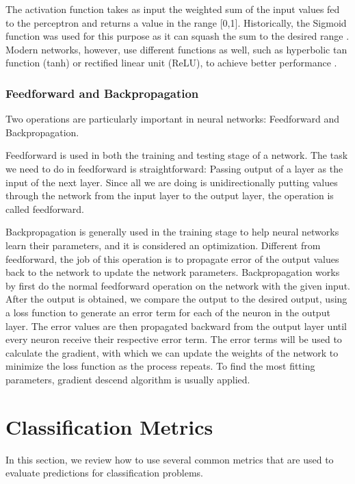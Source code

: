 The activation function takes as input the weighted sum of the input values fed to the perceptron and returns a value in the range [0,1]. Historically, the Sigmoid function was used for this purpose as it can squash the sum to the desired range \cite{li2015cs231n}. Modern networks, however, use different functions as well, such as hyperbolic tan function (tanh) or rectified linear unit (ReLU), to achieve better performance \cite{li2015cs231n}.

\subsubsection{Feedforward and Backpropagation}

Two operations are particularly important in neural networks: Feedforward and Backpropagation.

Feedforward is used in both the training and testing stage of a network. The task we need to do in feedforward is straightforward: Passing output of a layer as the input of the next layer. Since all we are doing is unidirectionally putting values through the network from the input layer to the output layer, the operation is called feedforward. 

Backpropagation is generally used in the training stage to help neural networks learn their parameters, and it is considered an optimization. Different from feedforward, the job of this operation is to propagate error of the output values back to the network to update the network parameters. Backpropagation works by first do the normal feedforward operation on the network with the given input. After the output is obtained, we compare the output to the desired output, using a loss function to generate an error term for each of the neuron in the output layer. The error values are then propagated backward from the output layer until every neuron receive their respective error term. The error terms will be used to calculate the gradient, with which we can update the weights of the network to minimize the loss function as the process repeats. To find the most fitting parameters, gradient descend algorithm is usually applied.

\section{Classification Metrics}

In this section, we review how to use several common metrics that are used to evaluate predictions for classification problems.

